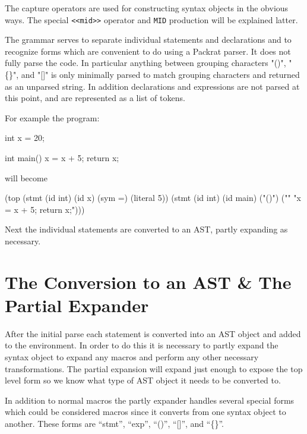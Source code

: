 \documentclass[12pt,english,letterpaper]{article}
\begin{document}
The capture operators are used for constructing syntax objects in the
obvious ways.  The special \verb/<<mid>>/ operator and \verb/MID/
production will be explained latter.

The grammar serves to separate individual statements and declarations
and to recognize forms which are convenient to do using a Packrat
parser.  It does not fully parse the code.  In particular anything
between grouping characters "()", "\{\}", and "[]" is only minimally
parsed to match grouping characters and returned as an unparsed
string.  In addition declarations and expressions are not parsed at
this point, and are represented as a list of tokens.

For example the program:

\begin{code}
int x = 20;

int main() {
  x = x + 5;
  return x;
}
\end{code}

will become

\begin{code}
(top 
  (stmt (id int) (id x) (sym =) (literal 5))
  (stmt (id int) (id main) ("()") ("{}" "x = x + 5; return x;")))
\end{code}

Next the individual statements are converted to an AST, partly
expanding as necessary.

\section{The Conversion to an AST \& The Partial Expander}

After the initial parse each statement is converted into an AST object
and added to the environment.  In order to do this it is necessary to
partly expand the syntax object to expand any macros and perform any
other necessary transformations.  The partial expansion will expand just
enough to expose the top level form so we know what type of AST object
it needs to be converted to.

In addition to normal macros the partly expander handles several
special forms which could be considered macros since it converts
from one syntax object to another.  These forms are ``stmt'', ``exp'',
``()'', ``[]'', and ``\{\}''.
\end{document}
